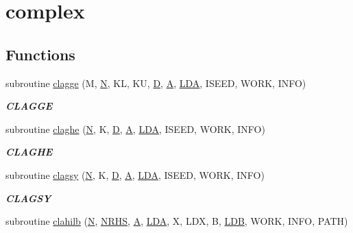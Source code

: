 \hypertarget{group__complex__matgen}{}\section{complex}
\label{group__complex__matgen}
\subsection*{Functions}
\begin{DoxyCompactItemize}
\item 
subroutine \hyperlink{group__complex__matgen_ga01a45e71da04e1130918ab95dbcd08c7}{clagge} (M, \hyperlink{polmisc_8c_a0240ac851181b84ac374872dc5434ee4}{N}, K\+L, K\+U, \hyperlink{odrpack_8h_a7dae6ea403d00f3687f24a874e67d139}{D}, \hyperlink{classA}{A}, \hyperlink{example__user_8c_ae946da542ce0db94dced19b2ecefd1aa}{L\+D\+A}, I\+S\+E\+E\+D, W\+O\+R\+K, I\+N\+F\+O)
\begin{DoxyCompactList}\small\item\em {\bfseries C\+L\+A\+G\+G\+E} \end{DoxyCompactList}\item 
subroutine \hyperlink{group__complex__matgen_ga7b4d68bedb34b4e82b4a7cb32be76d24}{claghe} (\hyperlink{polmisc_8c_a0240ac851181b84ac374872dc5434ee4}{N}, K, \hyperlink{odrpack_8h_a7dae6ea403d00f3687f24a874e67d139}{D}, \hyperlink{classA}{A}, \hyperlink{example__user_8c_ae946da542ce0db94dced19b2ecefd1aa}{L\+D\+A}, I\+S\+E\+E\+D, W\+O\+R\+K, I\+N\+F\+O)
\begin{DoxyCompactList}\small\item\em {\bfseries C\+L\+A\+G\+H\+E} \end{DoxyCompactList}\item 
subroutine \hyperlink{group__complex__matgen_gae43d0be5e9d0999d6a512e6842a6d65f}{clagsy} (\hyperlink{polmisc_8c_a0240ac851181b84ac374872dc5434ee4}{N}, K, \hyperlink{odrpack_8h_a7dae6ea403d00f3687f24a874e67d139}{D}, \hyperlink{classA}{A}, \hyperlink{example__user_8c_ae946da542ce0db94dced19b2ecefd1aa}{L\+D\+A}, I\+S\+E\+E\+D, W\+O\+R\+K, I\+N\+F\+O)
\begin{DoxyCompactList}\small\item\em {\bfseries C\+L\+A\+G\+S\+Y} \end{DoxyCompactList}\item 
subroutine \hyperlink{group__complex__matgen_gad3cf156a3529004d8ca739e77a1b4e16}{clahilb} (\hyperlink{polmisc_8c_a0240ac851181b84ac374872dc5434ee4}{N}, \hyperlink{example__user_8c_aa0138da002ce2a90360df2f521eb3198}{N\+R\+H\+S}, \hyperlink{classA}{A}, \hyperlink{example__user_8c_ae946da542ce0db94dced19b2ecefd1aa}{L\+D\+A}, X, L\+D\+X, B, \hyperlink{example__user_8c_a50e90a7104df172b5a89a06c47fcca04}{L\+D\+B}, W\+O\+R\+K, I\+N\+F\+O, P\+A\+T\+H)

\end{DoxyCompactItemize}
